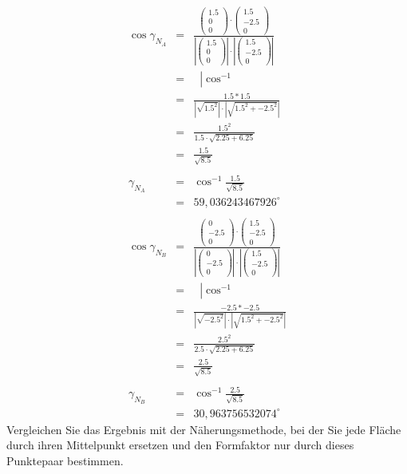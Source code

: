 \documentclass[11pt]{article}
\begin{document}
\begin{eqnarray*}
\cos \gamma_{N_A} &=& \frac{ 
\begin{pmatrix}
1.5 \\ 0 \\ 0
\end{pmatrix}
\cdot
\begin{pmatrix}
1.5 \\ -2.5 \\ 0
\end{pmatrix}
}{
\left| \begin{pmatrix}
1.5 \\ 0 \\ 0
\end{pmatrix} \right|
\cdot 
\left| \begin{pmatrix}
1.5 \\ -2.5 \\ 0
\end{pmatrix} \right|} \\
&=&  \;\; \left| \cos^{-1}\right.\\
&=& \frac{1.5 * 1.5 }{ \left|\sqrt{1.5^2}\right|\cdot \left|\sqrt{1.5^2 + -2.5^2}\right| }\\
&=& \frac{1.5^2}{1.5 \cdot \sqrt{2.25 + 6.25}}\\
&=& \frac{1.5}{\sqrt{8.5}} \\
& & \\ 
\gamma_{N_A} &=& \cos^{-1} \frac{1.5}{\sqrt{8.5}} \\
 &=& 59,036243467926^\circ \\
 & & \\
 \cos \gamma_{N_B} &=& \frac{ 
\begin{pmatrix}
0 \\ -2.5 \\ 0
\end{pmatrix}
\cdot
\begin{pmatrix}
1.5 \\ -2.5 \\ 0
\end{pmatrix}
}{
\left| \begin{pmatrix}
0 \\ -2.5 \\ 0
\end{pmatrix} \right|
\cdot 
\left| \begin{pmatrix}
1.5 \\ -2.5 \\ 0
\end{pmatrix} \right|} \\
&=&  \;\; \left| \cos^{-1}\right.\\
&=& \frac{-2.5 * -2.5 }{ \left|\sqrt{-2.5^2}\right|\cdot \left|\sqrt{1.5^2 + -2.5^2}\right| }\\
&=& \frac{2.5^2}{2.5 \cdot \sqrt{2.25 + 6.25}}\\
&=& \frac{2.5}{\sqrt{8.5}} \\
& & \\ 
\gamma_{N_B} &=& \cos^{-1} \frac{2.5}{\sqrt{8.5}} \\
&=&  30,963756532074^\circ
\end{eqnarray*}
Vergleichen Sie das Ergebnis mit der Näherungsmethode, bei der Sie jede Fläche durch ihren Mittelpunkt ersetzen und den Formfaktor nur durch dieses Punktepaar bestimmen.
\end{document}
